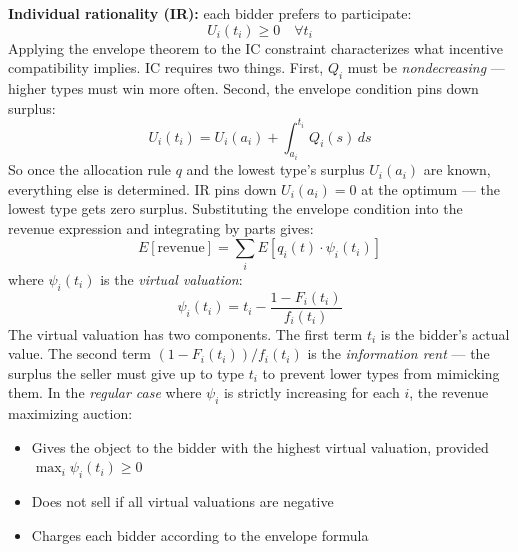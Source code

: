 \documentclass[11pt,english]{article}
\begin{document}
\textbf{Individual rationality (IR):} each bidder prefers to participate:
\begin{equation}
    U_i(t_i) \geq 0 \quad \forall t_i
\end{equation}
Applying the envelope theorem to the IC constraint characterizes what incentive compatibility implies. IC requires two things. First, $Q_i$ must be \textit{nondecreasing} --- higher types must win more often. Second, the envelope condition pins down surplus:
\begin{equation}
    U_i(t_i) = U_i(a_i) + \int_{a_i}^{t_i} Q_i(s)\, ds
\end{equation}
So once the allocation rule $q$ and the lowest type's surplus $U_i(a_i)$ are known, everything else is determined. IR pins down $U_i(a_i) = 0$ at the optimum --- the lowest type gets zero surplus. Substituting the envelope condition into the revenue expression and integrating by parts gives:
\begin{equation}
    E[\text{revenue}] = \sum_i E\left[q_i(t) \cdot \psi_i(t_i)\right]
\end{equation}
where $\psi_i(t_i)$ is the \textit{virtual valuation}:
\begin{equation}
    \psi_i(t_i) = t_i - \frac{1 - F_i(t_i)}{f_i(t_i)}
\end{equation}
The virtual valuation has two components. The first term $t_i$ is the bidder's actual value. The second term $(1-F_i(t_i))/f_i(t_i)$ is the \textit{information rent} --- the surplus the seller must give up to type $t_i$ to prevent lower types from mimicking them. In the \textit{regular case} where $\psi_i$ is strictly increasing for each $i$, the revenue maximizing auction:
\begin{itemize}
    \item Gives the object to the bidder with the highest virtual valuation, provided $\max_i \psi_i(t_i) \geq 0$
    \item Does not sell if all virtual valuations are negative
    \item Charges each bidder according to the envelope formula
\end{itemize}
\end{document}
